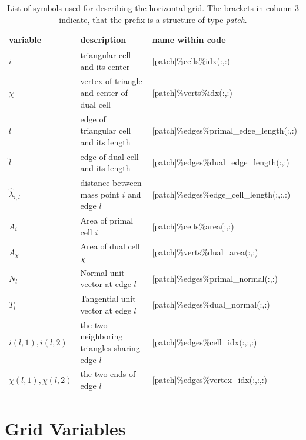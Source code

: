 \documentclass[a4paper,11pt,DIV16,BCOR1cm,titlepage]{scrartcl}
\begin{document}
\begin{table}[!h]
\small
\renewcommand{\arraystretch}{1.4}
\begin{center}
\begin{tabular}{|p{2.2cm}|p{5.0cm}|p{6.5cm}|}
\hline
\textbf{variable}  & \textbf{description}  & \textbf{name within code} \\ 
\hline\hline
$i$              & triangular cell and its center         & [patch]\%cells\%idx(:,:) \\
$\chi$           & vertex of triangle and center of dual cell & [patch]\%verts\%idx(:,:)\\
$l$              & edge of triangular cell and its length & [patch]\%edges\%primal\_edge\_length(:,:) \\
$\hat{l}$        & edge of dual cell and its length       & [patch]\%edges\%dual\_edge\_length(:,:) \\
$\hat{\lambda}_{i,l}$  & distance between mass point $i$ and edge $l$ & [patch]\%edges\%edge\_cell\_length(:,:,:)\\
$A_{i}$          & Area of primal cell $i$                & [patch]\%cells\%area(:,:) \\
$A_{\chi}$       & Area of dual cell $\chi$               & [patch]\%verts\%dual\_area(:,:)\\
$N_{l}$          & Normal unit vector at edge $l$         & [patch]\%edges\%primal\_normal(:,:) \\
$T_{l}$          & Tangential unit vector at edge $l$     & [patch]\%edges\%dual\_normal(:,:)\\
$i(l,1), i(l,2)$ & the two neighboring triangles sharing edge $l$  & [patch]\%edges\%cell\_idx(:,:,:) \\
$\chi(l,1), \chi(l,2)$ & the two ends of edge $l$         & [patch]\%edges\%vertex\_idx(:,:,:)\\
\hline
\end{tabular}
\caption{List of symbols used for describing the horizontal grid. The brackets in column $3$ indicate, 
that the prefix is a structure of type \emph{patch}.}\label{tbl_variables_grid_topology}
\end{center}
\end{table}


\clearpage
\newpage

\appendix

\section{Grid Variables}
\end{document}
